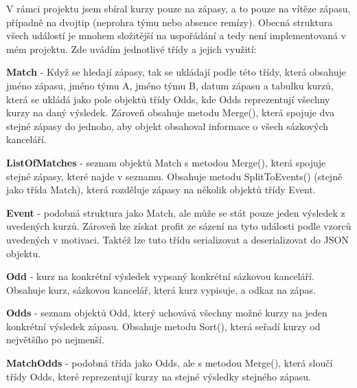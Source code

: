 \documentclass[11pt,a4paper,twoside,openright]{report}
\begin{document}
V rámci projektu jsem sbíral kurzy pouze na zápasy, a to pouze na vítěze zápasu, případně na dvojtip (neprohra týmu nebo absence remízy). Obecná struktura všech událostí je mnohem složitější na uspořádání a tedy není implementovaná v mém projektu. Zde uvádím jednotlivé třídy a jejich využití:

\textbf{Match} - Když se hledají zápasy, tak se ukládají podle této třídy, která obsahuje jméno zápasu, jméno týmu A, jméno týmu B, datum zápasu a tabulku kurzů, která se ukládá jako pole objektů třídy Odds, kde Odds reprezentují všechny kurzy na daný výsledek. Zároveň obsahuje metodu Merge(), která spojuje dva stejné zápasy do jednoho, aby objekt obsahoval informace o všech sázkových kanceláří.

\textbf{ListOfMatches} - seznam objektů Match s metodou Merge(), která spojuje stejné zápasy, které najde v seznamu. Obsahuje metodu SplitToEvents() (stejně jako třída Match), která rozděluje zápasy na několik objektů třídy Event. 

\textbf{Event} - podobná struktura jako Match, ale může se stát pouze jeden výsledek z uvedených kurzů. Zároveň lze získat profit ze sázení na tyto události podle vzorců uvedených v motivaci. Taktéž lze tuto třídu serializovat a deserializovat do JSON objektu.

\textbf{Odd} - kurz na konkrétní výsledek vypsaný konkrétní sázkovou kanceláří. Obsahuje kurz, sázkovou kancelář, která kurz vypisuje, a odkaz na zápas. 

\textbf{Odds} - seznam objektů Odd, který uchovává všechny možné kurzy na jeden konkrétní výsledek zápasu. Obsahuje metodu Sort(), která seřadí kurzy od největšího po nejmenší.

\textbf{MatchOdds} - podobná třída jako Odds, ale s metodou Merge(), která sloučí třídy Odds, které reprezentují kurzy na stejné výsledky stejného zápasu.  
\end{document}

